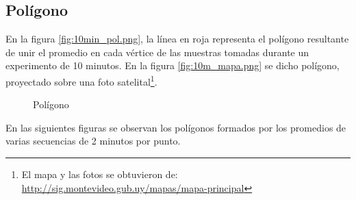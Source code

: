 \documentclass[main]{subfiles}
\begin{document}

\subsection{Polígono}
\label{sec:gps2-poligono}

En la figura \ref{fig:10min_pol.png}, la línea en roja representa el polígono resultante de unir el promedio en cada vértice de las muestras tomadas durante un experimento de 10 minutos. En la figura \ref{fig:10m_mapa.png} se dicho polígono, proyectado sobre una foto satelital\footnote{El mapa y las fotos se obtuvieron de:\\ \url{http://sig.montevideo.gub.uy/mapas/mapa-principal}}.

\begin{figure}[h!]
\vspace{-10pt}
  \centering
\vspace{-10pt}
\caption{Polígono}
\vspace{-10pt}
\end{figure}

En las siguientes figuras se observan los polígonos formados por los promedios de varias secuencias de 2 minutos por punto. 
\end{document}
